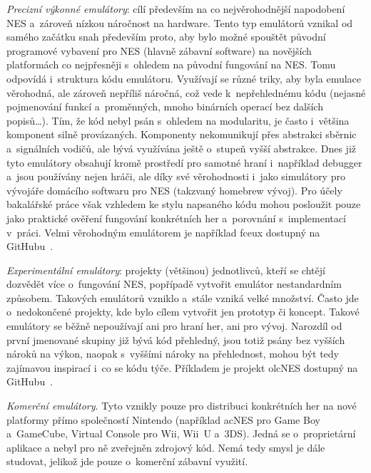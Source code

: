 \emph{Precizní výkonné emulátory}: cílí především na co nejvěrohodnější napodobení NES a~zároveň nízkou náročnost na hardware. Tento typ emulátorů vznikal od samého začátku snah především proto, aby bylo možné spouštět původní programové vybavení pro NES (hlavně zábavní software) na novějších platformách co nejpřesněji s~ohledem na původní fungování na NES. Tomu odpovídá i~struktura kódu emulátoru. Využívají se různé triky, aby byla emulace věrohodná, ale zároveň nepříliš náročná, což vede k~nepřehlednému kódu (nejasné pojmenování funkcí a~proměnných, mnoho binárních operací bez dalších popisů\dots). Tím, že kód nebyl psán s~ohledem na modularitu, je často i~většina komponent silně provázaných. Komponenty nekomunikují přes abstrakci sběrnic a~signálních vodičů, ale bývá využívána ještě o~stupeň vyšší abstrakce. Dnes již tyto emulátory obsahují kromě prostředí pro samotné hraní i~například debugger a~jsou používány nejen hráči, ale díky své věrohodnosti i~jako simulátory pro vývojáře domácího softwaru pro NES (takzvaný homebrew vývoj). Pro účely bakalářské práce však vzhledem ke stylu napsaného kódu mohou posloužit pouze jako praktické ověření fungování konkrétních her a~porovnání s~implementací v~práci. Velmi věrohodným emulátorem je například fceux dostupný na GitHubu~\cite{fceux}.

\emph{Experimentální emulátory}: projekty (většinou) jednotlivců, kteří se chtějí dozvědět více o~fungování NES, popřípadě vytvořit emulátor nestandardním způsobem. Takových emulátorů vzniklo a~stále vzniká velké množství. Často jde o~nedokončené projekty, kde bylo cílem vytvořit jen prototyp či koncept. Takové emulátory se běžně nepoužívají ani pro hraní her, ani pro vývoj. Narozdíl od první jmenované skupiny již bývá kód přehledný, jsou totiž psány bez vyšších nároků na výkon, naopak s~vyššími nároky na přehlednost, mohou být tedy zajímavou inspirací i~co se kódu týče. Příkladem je projekt olcNES dostupný na GitHubu~\cite{olcNES}.

\emph{Komerční emulátory}. Tyto vznikly pouze pro distribuci konkrétních her na nové platformy přímo společností Nintendo (například acNES pro Game Boy a~GameCube, Virtual Console pro Wii, Wii~U a~3DS). Jedná se o~proprietární aplikace a nebyl pro ně zveřejněn zdrojový kód. Nemá tedy smysl je dále studovat, jelikož jde pouze o~komerční zábavní využití.

